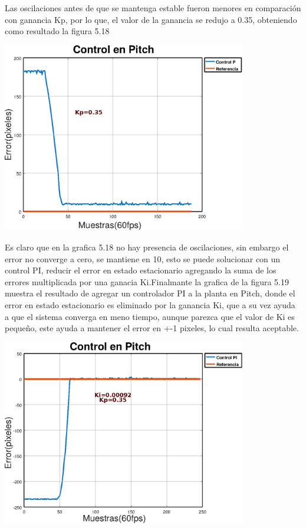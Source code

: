 Las oscilaciones antes de que se mantenga estable fueron menores en comparación con ganancia Kp, por lo que, el valor de la ganancia se 
redujo a 0.35, obteniendo como resultado la figura 5.18 
\begin{center}
	\includegraphics[width=0.8\textwidth]{Contenido/Cuerpo/Capitulo5/Fig27.eps}
	\label{Fig4}
\end{center}
Es claro que en la grafica 5.18 no hay presencia de oscilaciones, sin embargo el error no converge a cero, se mantiene en 10, esto se 
puede solucionar con un control PI, reducir el error en estado estacionario agregando la suma de los errores multiplicada por una ganacia 
Ki.Finalmante la grafica de la figura 5.19 muestra el resultado de agregar un controlador PI a la planta en Pitch, donde el error en estado 
estacionario es eliminado por la ganancia Ki, que a su vez ayuda a que el sistema converga en meno tiempo, aunque parezca que el valor de 
Ki es pequeño, este ayuda a mantener el error en +-1 pixeles, lo cual resulta aceptable.
\begin{center}
	\includegraphics[width=0.8\textwidth]{Contenido/Cuerpo/Capitulo5/Fig28.eps}
	\label{Fig4}
\end{center}


